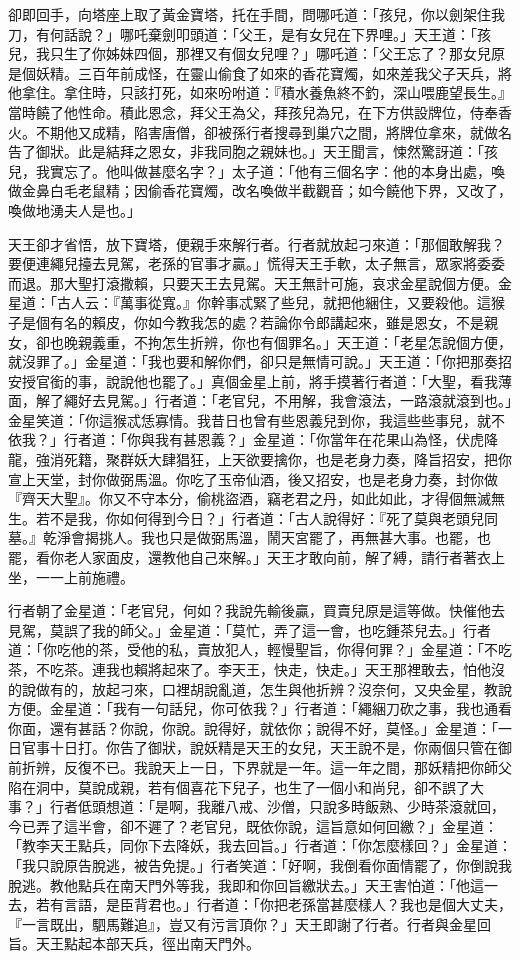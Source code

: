卻即回手，向塔座上取了黃金寶塔，托在手間，問哪吒道：「孩兒，你以劍架住我刀，有何話說？」哪吒棄劍叩頭道：「父王，是有女兒在下界哩。」天王道：「孩兒，我只生了你姊妹四個，那裡又有個女兒哩？」哪吒道：「父王忘了？那女兒原是個妖精。三百年前成怪，在靈山偷食了如來的香花寶燭，如來差我父子天兵，將他拿住。拿住時，只該打死，如來吩咐道：『積水養魚終不釣，深山喂鹿望長生。』當時饒了他性命。積此恩念，拜父王為父，拜孩兒為兄，在下方供設牌位，侍奉香火。不期他又成精，陷害唐僧，卻被孫行者搜尋到巢穴之間，將牌位拿來，就做名告了御狀。此是結拜之恩女，非我同胞之親妹也。」天王聞言，悚然驚訝道：「孩兒，我實忘了。他叫做甚麼名字？」太子道：「他有三個名字：他的本身出處，喚做金鼻白毛老鼠精；因偷香花寶燭，改名喚做半截觀音；如今饒他下界，又改了，喚做地湧夫人是也。」

天王卻才省悟，放下寶塔，便親手來解行者。行者就放起刁來道：「那個敢解我？要便連繩兒擡去見駕，老孫的官事才贏。」慌得天王手軟，太子無言，眾家將委委而退。那大聖打滾撒賴，只要天王去見駕。天王無計可施，哀求金星說個方便。金星道：「古人云：『萬事從寬。』你幹事忒緊了些兒，就把他綑住，又要殺他。這猴子是個有名的賴皮，你如今教我怎的處？若論你令郎講起來，雖是恩女，不是親女，卻也晚親義重，不拘怎生折辨，你也有個罪名。」天王道：「老星怎說個方便，就沒罪了。」金星道：「我也要和解你們，卻只是無情可說。」天王道：「你把那奏招安授官銜的事，說說他也罷了。」真個金星上前，將手摸著行者道：「大聖，看我薄面，解了繩好去見駕。」行者道：「老官兒，不用解，我會滾法，一路滾就滾到也。」金星笑道：「你這猴忒恁寡情。我昔日也曾有些恩義兒到你，我這些些事兒，就不依我？」行者道：「你與我有甚恩義？」金星道：「你當年在花果山為怪，伏虎降龍，強消死籍，聚群妖大肆猖狂，上天欲要擒你，也是老身力奏，降旨招安，把你宣上天堂，封你做弼馬溫。你吃了玉帝仙酒，後又招安，也是老身力奏，封你做『齊天大聖』。你又不守本分，偷桃盜酒，竊老君之丹，如此如此，才得個無滅無生。若不是我，你如何得到今日？」行者道：「古人說得好：『死了莫與老頭兒同墓。』乾淨會揭挑人。我也只是做弼馬溫，鬧天宮罷了，再無甚大事。也罷，也罷，看你老人家面皮，還教他自己來解。」天王才敢向前，解了縛，請行者著衣上坐，一一上前施禮。

行者朝了金星道：「老官兒，何如？我說先輸後贏，買賣兒原是這等做。快催他去見駕，莫誤了我的師父。」金星道：「莫忙，弄了這一會，也吃鍾茶兒去。」行者道：「你吃他的茶，受他的私，賣放犯人，輕慢聖旨，你得何罪？」金星道：「不吃茶，不吃茶。連我也賴將起來了。李天王，快走，快走。」天王那裡敢去，怕他沒的說做有的，放起刁來，口裡胡說亂道，怎生與他折辨？沒奈何，又央金星，教說方便。金星道：「我有一句話兒，你可依我？」行者道：「繩綑刀砍之事，我也通看你面，還有甚話？你說，你說。說得好，就依你；說得不好，莫怪。」金星道：「一日官事十日打。你告了御狀，說妖精是天王的女兒，天王說不是，你兩個只管在御前折辨，反復不已。我說天上一日，下界就是一年。這一年之間，那妖精把你師父陷在洞中，莫說成親，若有個喜花下兒子，也生了一個小和尚兒，卻不誤了大事？」行者低頭想道：「是啊，我離八戒、沙僧，只說多時飯熟、少時茶滾就回，今已弄了這半會，卻不遲了？老官兒，既依你說，這旨意如何回繳？」金星道：「教李天王點兵，同你下去降妖，我去回旨。」行者道：「你怎麼樣回？」金星道：「我只說原告脫逃，被告免提。」行者笑道：「好啊，我倒看你面情罷了，你倒說我脫逃。教他點兵在南天門外等我，我即和你回旨繳狀去。」天王害怕道：「他這一去，若有言語，是臣背君也。」行者道：「你把老孫當甚麼樣人？我也是個大丈夫，『一言既出，駟馬難追』，豈又有污言頂你？」天王即謝了行者。行者與金星回旨。天王點起本部天兵，徑出南天門外。


